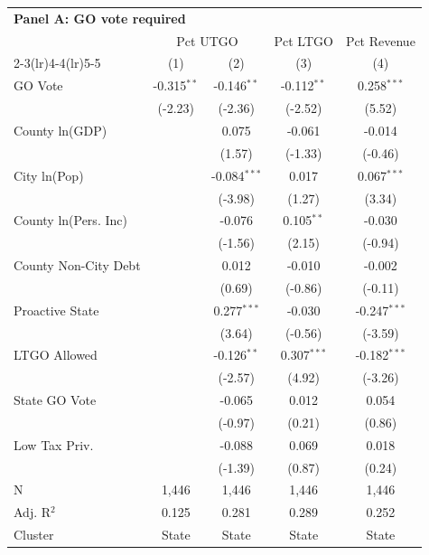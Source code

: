 \begingroup
\centering
\begin{tabular*}{\textwidth}{@{\extracolsep{\fill}}lcccc}
\multicolumn{5}{l}{\textbf{Panel A: GO vote required}}\\

\addlinespace
   \toprule
    & \multicolumn{2}{c}{Pct UTGO} & Pct LTGO & Pct Revenue\\
   \cmidrule(lr){2-3}\cmidrule(lr){4-4}\cmidrule(lr){5-5}
                        & (1)           & (2)            & (3)           & (4)\\  
   \midrule 
   GO Vote              & -0.315$^{**}$ & -0.146$^{**}$  & -0.112$^{**}$ & 0.258$^{***}$\\   
                        & (-2.23)      & (-2.36)       & (-2.52)      & (5.52)\\   
   County ln(GDP)       &               & 0.075          & -0.061        & -0.014\\   
                        &               & (1.57)        & (-1.33)      & (-0.46)\\   
   City ln(Pop)         &               & -0.084$^{***}$ & 0.017         & 0.067$^{***}$\\   
                        &               & (-3.98)       & (1.27)       & (3.34)\\   
   County ln(Pers. Inc) &               & -0.076         & 0.105$^{**}$  & -0.030\\   
                        &               & (-1.56)       & (2.15)       & (-0.94)\\   
   County Non-City Debt &               & 0.012          & -0.010        & -0.002\\   
                        &               & (0.69)        & (-0.86)      & (-0.11)\\   
   Proactive State      &               & 0.277$^{***}$  & -0.030        & -0.247$^{***}$\\   
                        &               & (3.64)        & (-0.56)      & (-3.59)\\   
   LTGO Allowed         &               & -0.126$^{**}$  & 0.307$^{***}$ & -0.182$^{***}$\\   
                        &               & (-2.57)       & (4.92)       & (-3.26)\\   
   State GO Vote        &               & -0.065         & 0.012         & 0.054\\   
                        &               & (-0.97)       & (0.21)       & (0.86)\\   
   Low Tax Priv.        &               & -0.088         & 0.069         & 0.018\\   
                        &               & (-1.39)       & (0.87)       & (0.24)\\   
   \hline
   N         & 1,446         & 1,446          & 1,446         & 1,446\\  
   Adj. R$^2$       & 0.125         & 0.281          & 0.289         & 0.252\\  
   Cluster              & State & State & State & State\\  
   \bottomrule
\end{tabular*}
\par\endgroup
